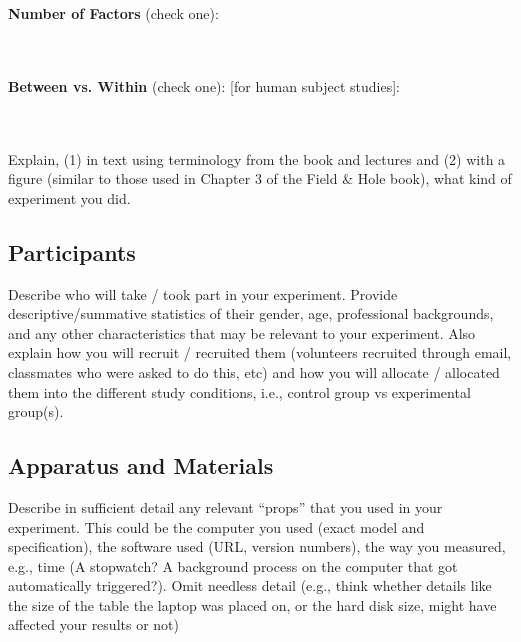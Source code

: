 \documentclass{article}
\begin{document}
\textbf{Number of Factors} (check one):\\
\noindent
\begin{minipage}{0.4\textwidth}
\end{minipage}%
\begin{minipage}{0.4\textwidth}
\end{minipage}%
\begin{minipage}{0.0\textwidth}
\end{minipage}\\\\

\textbf{Between vs. Within} (check one): [for human subject studies]:\\
\noindent
\begin{minipage}{0.4\textwidth}
\end{minipage}%
\begin{minipage}{0.4\textwidth}
\end{minipage}%
\begin{minipage}{0.0\textwidth}
\end{minipage}\\\\
Explain, (1) in text using terminology from the book and lectures and (2) with a figure (similar to those used in Chapter 3 of the Field & Hole book), what kind of experiment you did.

\subsection{Participants}
Describe who will take / took part in your experiment. Provide descriptive/summative statistics of their gender, age, professional backgrounds, and any other characteristics that may be relevant to your experiment. Also explain how you will recruit / recruited them (volunteers recruited through email, classmates who were asked to do this, etc) and how you will allocate / allocated them into the different study conditions, i.e., control group vs experimental group(s).


\subsection{Apparatus and Materials}
Describe in sufficient detail any relevant “props” that you used in your experiment. This could be the computer
you used (exact model and specification), the software used (URL, version numbers), the way you measured, e.g.,
time (A stopwatch? A background process on the computer that got automatically triggered?). Omit needless
detail (e.g., think whether details like the size of the table the laptop was placed on, or the hard disk size, might
have affected your results or not)
\end{document}
